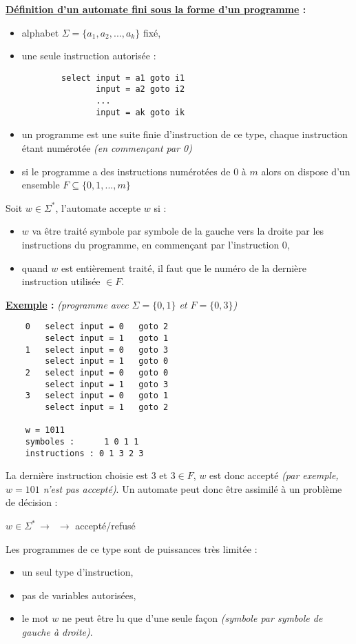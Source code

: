 \documentclass{article}
\begin{document}
\begin{sffamily}
\noindent\textbf{\underline{Définition d'un automate fini sous la forme d'un programme} :} 
\begin{itemize}
\item alphabet $\Sigma = \{a_1,a_2,...,a_k\}$ fixé,
\item une seule instruction autorisée :
	\begin{verbatim}
	    select input = a1 goto i1
	           input = a2 goto i2
	           ...
	           input = ak goto ik	    
	\end{verbatim}
\item un programme est une suite finie d'instruction de ce type, chaque instruction étant numérotée \textit{(en 
commençant par 0)}
\item si le programme a des instructions numérotées de $0$ à $m$ alors on dispose d'un ensemble $F\subseteq 
\{0,1,...,m\}$
\end{itemize}
Soit $w \in \Sigma^*$, l'automate accepte $w$ si : 
\begin{itemize}
\item $w$ va être traité symbole par symbole de la gauche vers la droite par les instructions du programme, en 
commençant par l'instruction $0$,
\item quand $w$ est entièrement traité, il faut que le numéro de la dernière instruction utilisée $\in F$.\\
\end{itemize}

\noindent\textbf{\underline{Exemple} :} \textit{(programme avec $\Sigma = \{0,1\}$ et $F=\{0,3\}$)}
	\begin{verbatim}
	0   select input = 0   goto 2
	    select input = 1   goto 1
	1   select input = 0   goto 3
	    select input = 1   goto 0
	2   select input = 0   goto 0
	    select input = 1   goto 3
	3   select input = 0   goto 1
	    select input = 1   goto 2
	
	w = 1011
	symboles :      1 0 1 1
	instructions : 0 1 3 2 3
	\end{verbatim}
La dernière instruction choisie est $3$ et $3 \in F$, $w$ est donc accepté \textit{(par exemple, $w=101$ n'est pas 
accepté)}. Un automate peut donc être assimilé à un problème de décision :
\begin{center}
$w\in\Sigma^*\, \to \,$  $\to$ accepté/refusé
\end{center}

Les programmes de ce type sont de puissances très limitée :
\begin{itemize}
\item un seul type d'instruction,
\item pas de variables autorisées,
\item le mot $w$ ne peut être lu que d'une seule façon \textit{(symbole par symbole de gauche à droite)}.
\end{itemize}


\end{sffamily}
\end{document}
